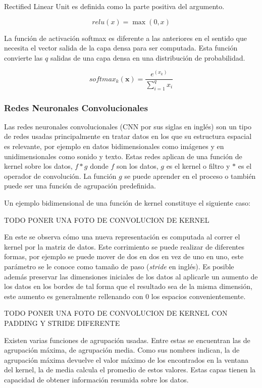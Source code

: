 Rectified Linear Unit es definida como la parte positiva del argumento. 

\begin{equation}
	relu(x) = \max(0, x)
\end{equation}\label{eq:relu}

La función de activación softmax es diferente a las anteriores en el sentido que necesita
el vector salida de la capa densa para ser computada. Esta función convierte las $q$ salidas
de una capa densa en una distribución de probabilidad.

\begin{equation}
	softmax_k(\textbf{x}) = \frac{e^(x_k)}{\sum_{i=1}^q x_i}
\end{equation}\label{eq:softmax}

\subsubsection{Redes Neuronales Convolucionales}

Las redes neuronales convolucionales (CNN por sus siglas en inglés) son un tipo de redes usadas
principalmente en tratar datos en los que su estructura espacial es relevante, por ejemplo
en datos bidimensionales como imágenes y en unidimensionales como sonido y texto.
Estas redes aplican de una función de kernel sobre los datos, $f * g$ donde $f$ son los
datos, $g$ es el kernel o filtro y $*$ es el operador de convolución. La función $g$ se puede 
aprender en el proceso o también puede ser una función de agrupación predefinida.   

Un ejemplo bidimensional de una función de kernel constituye el siguiente caso:

TODO PONER UNA FOTO DE CONVOLUCION DE KERNEL

En este se observa cómo una nueva representación es computada al correr el kernel por la matriz de datos. Este
corrimiento se puede realizar de diferentes formas, por ejemplo se puede mover de dos en dos en vez de uno en uno, este
parámetro se le conoce como tamaño de paso (\emph{stride} en inglés). Es posible además preservar las dimensiones
iniciales de los datos al aplicarle un aumento de los datos en los bordes de tal forma que el resultado sea de la misma
dimensión, este aumento es generalmente rellenando con 0 los espacios convenientemente.

TODO PONER UNA FOTO DE CONVOLUCION DE KERNEL CON PADDING Y STRIDE DIFERENTE

Existen varias funciones de agrupación usadas. Entre estas se encuentran las de agrupación máxima, de 
agrupación media. Como sus nombres indican, la de agrupación máxima devuelve el valor máximo de los encontrados
en la ventana del kernel, la de media calcula el promedio de estos valores. Estas capas tienen la capacidad de obtener
información resumida sobre los datos.

